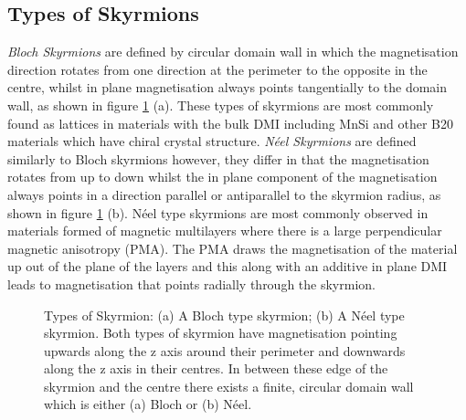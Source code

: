     \subsection{Types of Skyrmions}\label{subsec:TypesSkyrmions}
    \emph{Bloch Skyrmions}\label{subsec:Bloch} are defined by circular domain wall in which the magnetisation direction rotates from one direction at the perimeter to the opposite in the centre, whilst in plane magnetisation always points tangentially to the domain wall, as shown in figure \ref{fig:SkyrmionTypes} (a). These types of skyrmions are most commonly found as lattices in materials with the bulk DMI including MnSi and other B20 materials which have chiral crystal structure.\cite{Muhlbauer2009,Schulz2012}
    \emph{N\'{e}el Skyrmions} \label{subsec:Neel} are defined similarly to Bloch skyrmions however, they differ in that the magnetisation rotates from up to down whilst the in plane component of the magnetisation always points in a direction parallel or antiparallel to the skyrmion radius, as shown in figure \ref{fig:SkyrmionTypes} (b). N\'{e}el type skyrmions are most commonly observed in materials formed of magnetic multilayers where there is a large perpendicular magnetic anisotropy (PMA). The PMA draws the magnetisation of the material up out of the plane of the layers and this along with an additive in plane DMI leads to magnetisation that points radially through the skyrmion.

    \begin{figure}[t]
        \centering
           \caption{Types of Skyrmion: (a) A Bloch type skyrmion; (b) A N\'{e}el type skyrmion.
           Both types of skyrmion have magnetisation pointing upwards along the z axis around their perimeter and downwards along the z axis in their centres. In between these edge of the skyrmion and the centre there exists a finite, circular domain wall which is either (a) Bloch or (b) N\'{e}el.}
            \label{fig:SkyrmionTypes}
    \end{figure}

